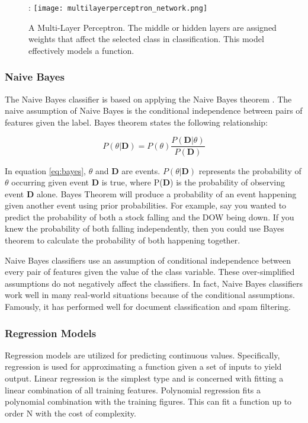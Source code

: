 \begin{figure}[htp]:
    \centering
    \texttt{[image: multilayerperceptron\_network.png]}
    \caption{A Multi-Layer Perceptron.
    The middle or hidden layers are assigned weights that affect the selected class in classification.
    This model effectively models a function.}
    \label{}
\end{figure}



\subsubsection{Naive Bayes}
The Naive Bayes classifier is based on applying the Naive Bayes theorem \cite{zhang2004optimality}.
The naive assumption of Naive Bayes is the conditional independence between pairs of features given the label.
Bayes theorem states the following relationship:

\begin{equation}
    \label{eq:bayes}
    P(\theta|\textbf{D}) = P(\theta) \frac{P(\textbf{D} |\theta)}{P(\textbf{D})}
\end{equation}

In equation \ref{eq:bayes}, $\theta$ and \textbf{D} are events. 
\(P(\theta | \textbf{D})\) represents the probability of $\theta$ occurring given event \textbf{D} is true, where P(\textbf{D}) is the probability of observing event \textbf{D} alone.
Bayes Theorem will produce a probability of an event happening given another event using prior probabilities.
For example, say you wanted to predict the probability of both a stock falling and the DOW being down.
If you knew the probability of both falling independently, then you could use Bayes theorem to calculate the probability of both happening together.

Naive Bayes classifiers use an assumption of conditional independence between every pair of features given the value of the class variable. 
These over-simplified assumptions do not negatively affect the classifiers.
In fact, Naive Bayes classifiers work well in many real-world situations because of the conditional assumptions\cite{zhang2004optimality}.
Famously, it has performed well for document classification and spam filtering. 

\subsubsection{Regression Models}
Regression models are utilized for predicting continuous values.
Specifically, regression is used for approximating a function given a set of inputs to yield output.
Linear regression is the simplest type and is concerned with fitting a linear combination of all training features.
Polynomial regression fits a polynomial combination with the training figures.
This can fit a function up to order N with the cost of complexity. \\

